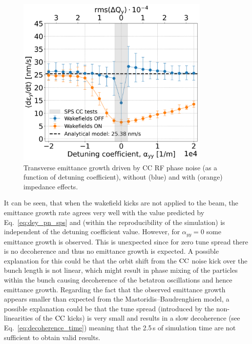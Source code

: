 
\begin{figure}[!h] %
    \centering         
    \includegraphics[width=0.85\textwidth]{images/Ch7/deyRates_final_2018_PN_sps_270GeV_PN1e-8_400MHz_y-plane_QpxQpy5e-1_6D_Nb5e5_intensity3e10_ayyScan_wakesON_vs_OFF_vs_TuneSpreadvsExpectedSPS.png}
        \caption{Transverse emittance growth driven by CC RF phase noise (as a function of detuning coefficient), without (blue) and with (orange) impedance effects.}
        \label{fig:MD_2018_impedance_simulations_amplitude_detuning}
 \end{figure}

It can be seen, that when the wakefield kicks are not applied to the beam, the emittance growth rate agrees very well with the value predicted by Eq.~\eqref{eq:dey_pn_sps} and (within the reproducibility of the simulation) is independent of the detuning coefficient value. However, for $\alpha_{yy}=0$ some emittance growth is observed. This is unexpected since for zero tune spread there is no decoherence and thus no emittance growth is expected. A possible explanation for this could be that the orbit shift from the ${\mathrm{CC}}$ noise kick over the bunch length is not linear, which might result in phase mixing of the particles within the bunch causing decoherence of the betatron oscillations and hence emittance growth. Regarding the fact that the observed emittance growth appears smaller than expected from the Mastoridis--Baudrenghien model, a possible explanation could be that the tune spread (introduced by the non-linearities of the ${\mathrm{CC}}$ kicks) is very small and results in a slow decoherence (see Eq.~\eqref{eq:decoherence_time}) meaning that the 2.5\,s of simulation time are not sufficient to obtain valid results.

